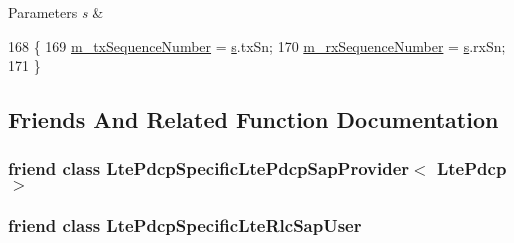 \begin{DoxyParams}{Parameters}
{\em s} & \\
\hline
\end{DoxyParams}

\begin{DoxyCode}
168 \{
169   \hyperlink{classns3_1_1LtePdcp_a4f46368bfb47f0f95fe22dc92c740b4f}{m\_txSequenceNumber} = \hyperlink{generate__test__data__lte__sinr_8m_ad83eeb3a142285d1243a08c6b7026df8}{s}.txSn;
170   \hyperlink{classns3_1_1LtePdcp_a0b2d8af5261983cd068ed0b1bdde628d}{m\_rxSequenceNumber} = \hyperlink{generate__test__data__lte__sinr_8m_ad83eeb3a142285d1243a08c6b7026df8}{s}.rxSn;
171 \}
\end{DoxyCode}


\subsection{Friends And Related Function Documentation}
\subsubsection[{\texorpdfstring{Lte\+Pdcp\+Specific\+Lte\+Pdcp\+Sap\+Provider$<$ Lte\+Pdcp $>$}{LtePdcpSpecificLtePdcpSapProvider< LtePdcp >}}]{\setlength{\rightskip}{0pt plus 5cm}friend class {\bf Lte\+Pdcp\+Specific\+Lte\+Pdcp\+Sap\+Provider}$<$ {\bf Lte\+Pdcp} $>$\hspace{0.3cm}{\ttfamily [friend]}}\hypertarget{classns3_1_1LtePdcp_a54df937c710dc8d82dcc927029d841b5}{}\label{classns3_1_1LtePdcp_a54df937c710dc8d82dcc927029d841b5}
\subsubsection[{\texorpdfstring{Lte\+Pdcp\+Specific\+Lte\+Rlc\+Sap\+User}{LtePdcpSpecificLteRlcSapUser}}]{\setlength{\rightskip}{0pt plus 5cm}friend class {\bf Lte\+Pdcp\+Specific\+Lte\+Rlc\+Sap\+User}\hspace{0.3cm}{\ttfamily [friend]}}\hypertarget{classns3_1_1LtePdcp_a884ace81c7eb1a75bd416b1ba6215e95}{}\label{classns3_1_1LtePdcp_a884ace81c7eb1a75bd416b1ba6215e95}


